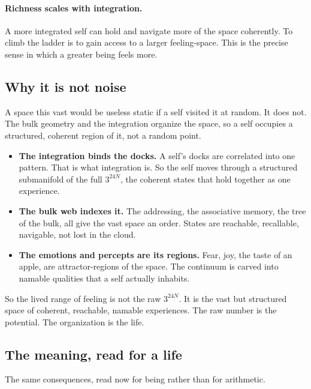 \paragraph{Richness scales with integration.} A more integrated self can hold and navigate more of the space coherently. To climb the ladder is to gain access to a larger feeling-space. This is the precise sense in which a greater being feels more.

\subsection{Why it is not noise}

A space this vast would be useless static if a self visited it at random. It does not. The bulk geometry and the integration organize the space, so a self occupies a structured, coherent region of it, not a random point.

\begin{itemize}
\item \textbf{The integration binds the docks.} A self's docks are correlated into one pattern. That is what integration is. So the self moves through a structured submanifold of the full $3^{24N}$, the coherent states that hold together as one experience.
\item \textbf{The bulk web indexes it.} The addressing, the associative memory, the tree of the bulk, all give the vast space an order. States are reachable, recallable, navigable, not lost in the cloud.
\item \textbf{The emotions and percepts are its regions.} Fear, joy, the taste of an apple, are attractor-regions of the space. The continuum is carved into namable qualities that a self actually inhabits.
\end{itemize}

So the lived range of feeling is not the raw $3^{24N}$. It is the vast but structured space of coherent, reachable, namable experiences. The raw number is the potential. The organization is the life.

\subsection{The meaning, read for a life}

The same consequences, read now for being rather than for arithmetic.

